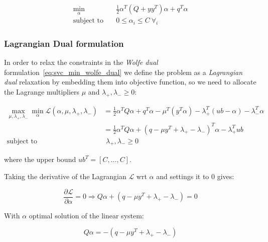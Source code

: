 \begin{equation} \label{eq:svc_min_bcqp_wolf_dual}
    \begin{aligned}
        \min_{\alpha} \quad & \frac{1}{2} \alpha^T (Q + yy^T)\alpha+q^T\alpha \\
            \text{subject to} \quad & 0\leq\alpha_i\leq C \ \forall_i
    \end{aligned}
\end{equation}

\subsubsection{Lagrangian Dual formulation}

In order to relax the constraints in the \emph{Wolfe dual} formulation~\eqref{eq:svc_min_wolfe_dual} we define the problem as a \emph{Lagrangian dual} relaxation by embedding them into objective function, so we need to allocate the Lagrange multipliers $\mu$ and $\lambda_+, \lambda_- \geq 0$:

\begin{equation} \label{eq:l1_svc_lagrangian_dual}
	\begin{aligned}
		    \max_{\mu,\lambda_+,\lambda_-} \min_{\alpha} \mathcal{L}(\alpha,\mu,\lambda_+,\lambda_-) &= \frac{1}{2} \alpha^T Q\alpha+q^T\alpha - \mu^T (y^T \alpha) - \lambda_+^T (ub - \alpha) - \lambda_-^T \alpha \\
    &= \frac{1}{2} \alpha^T Q\alpha + (q - \mu y^T + \lambda_+ - \lambda_-)^T \alpha - \lambda_+^T ub \\
    \text{subject to} \quad & \,\, \lambda_+, \lambda_- \geq 0
	\end{aligned}
\end{equation}

where the upper bound $ub^T = [C, \dots, C]$.

Taking the derivative of the Lagrangian $\mathcal{L}$ wrt $\alpha$ and settings it to 0 gives:

\begin{equation} \label{eq:svc_lagrangian_der_a}
	\frac{\partial \mathcal{L}}{\partial \alpha}=0\Rightarrow Q \alpha + (q - \mu y^T + \lambda_+ - \lambda_-) = 0
\end{equation}

With $\alpha$ optimal solution of the linear system:

\begin{equation} \label{eq:l1_svc_lagrangian_sol}
    Q \alpha = - (q - \mu y^T + \lambda_+ - \lambda_-)
\end{equation}

